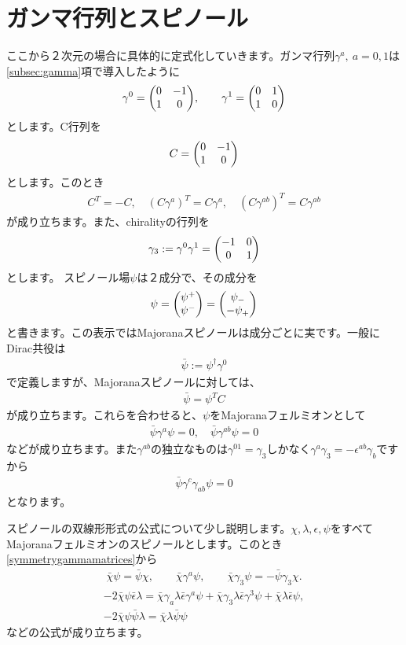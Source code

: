 \documentclass[report,paper=a4, fontsize=12pt, line_length=16cm, number_of_lines=34,dvipdfmx]{jlreq}
\numberwithin{equation}{chapter}
\numberwithin{equation}{section}
\newcommand{\psib}{\bar{\psi}}
\newcommand{\chib}{\bar{\chi}}
\newcommand{\epsilonb}{\bar{\epsilon}}
\begin{document}
\section{ガンマ行列とスピノール}
ここから２次元の場合に具体的に定式化していきます。ガンマ行列$\gamma^{a},\ a=0,1$は\ref{subsec:gamma}項で導入したように
\begin{align}
  \gamma^{0}=
  \mqty(0 & -1 \\
    1 &0),\qquad
  \gamma^{1}=
  \mqty(0 & 1 \\
    1 &0)
\end{align}
とします。C行列を
\begin{align}
  C=\mqty(0 & -1 \\
  1 &0)
\end{align}
とします。このとき
\begin{align}
  C^{T}=-C,\quad (C\gamma^{a})^{T}=C\gamma^{a},\quad (C\gamma^{ab})^{T}=C\gamma^{ab}\label{symmetrygammamatrices}
\end{align}
が成り立ちます。また、chiralityの行列を
\begin{align}
  \gamma_3:=\gamma^{0}\gamma^{1}=\mqty(
    -1 & 0\\
    0 & 1
  )
\end{align}
とします。
スピノール場$\psi$は２成分で、その成分を
\begin{align}
  \psi
  =\mqty(\psi^{+}\\ \psi^{-})
  =\mqty(\psi_{-}\\ -\psi_{+})
\end{align}
と書きます。この表示ではMajoranaスピノールは成分ごとに実です。一般にDirac共役は
\begin{align}
  \psib:=\psi^{\dag}\gamma^{0}
\end{align}
で定義しますが、Majoranaスピノールに対しては、
\begin{align}
  \psib=\psi^{T}C
\end{align}
が成り立ちます。これらを合わせると、$\psi$をMajoranaフェルミオンとして
\begin{align}
  \psib \gamma^a \psi=0,\quad \psib \gamma^{ab}\psi=0
\end{align}
などが成り立ちます。また$\gamma^{ab}$の独立なものは$\gamma^{01}=\gamma_3$しかなく$\gamma^{a}\gamma_3=-\epsilon^{ab}\gamma_{b}$ですから
\begin{align}
  \psib \gamma^c\gamma_{ab}\psi=0\label{vanishingspinconnectionterm}
\end{align}
となります。

スピノールの双線形形式の公式について少し説明します。$\chi,\lambda,\epsilon,\psi$をすべてMajoranaフェルミオンのスピノールとします。このとき\eqref{symmetrygammamatrices}から
\begin{align}
  \chib \psi = \psib \chi,\qquad \chib \gamma^{a}\psi,\qquad \chib \gamma_3 \psi = -\psib \gamma_3 \chi.
\end{align}
\begin{align}
  -2\chib \psi \epsilonb \lambda =
  \chib \gamma_{a} \lambda \epsilonb \gamma^{a}\psi+
  \chib \gamma_{3} \lambda \epsilonb \gamma^{3}\psi+
  \chib \lambda \epsilonb \psi,\\
  -2\chib\psi \psib \lambda=\chib \lambda \psib \psi
\end{align}
などの公式が成り立ちます。
\end{document}
